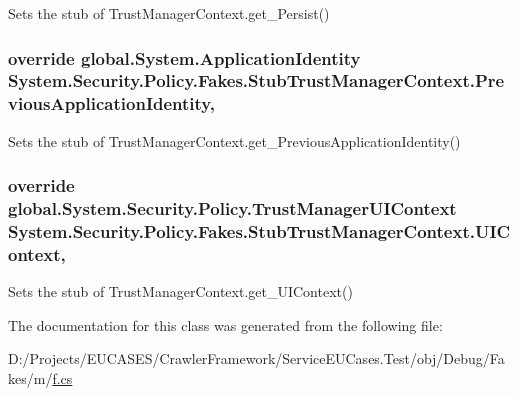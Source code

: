 Sets the stub of Trust\-Manager\-Context.\-get\-\_\-\-Persist()

\hypertarget{class_system_1_1_security_1_1_policy_1_1_fakes_1_1_stub_trust_manager_context_a607ca6c8527dcd2dd3aedb20d40cab5b}{
\subsubsection[{Previous\-Application\-Identity}]{\setlength{\rightskip}{0pt plus 5cm}override global.\-System.\-Application\-Identity System.\-Security.\-Policy.\-Fakes.\-Stub\-Trust\-Manager\-Context.\-Previous\-Application\-Identity\hspace{0.3cm}{\ttfamily [get]}, {\ttfamily [set]}}}\label{class_system_1_1_security_1_1_policy_1_1_fakes_1_1_stub_trust_manager_context_a607ca6c8527dcd2dd3aedb20d40cab5b}


Sets the stub of Trust\-Manager\-Context.\-get\-\_\-\-Previous\-Application\-Identity()

\hypertarget{class_system_1_1_security_1_1_policy_1_1_fakes_1_1_stub_trust_manager_context_a27fe169ba01ad0c4d2f5cb620e6fcdb6}{
\subsubsection[{U\-I\-Context}]{\setlength{\rightskip}{0pt plus 5cm}override global.\-System.\-Security.\-Policy.\-Trust\-Manager\-U\-I\-Context System.\-Security.\-Policy.\-Fakes.\-Stub\-Trust\-Manager\-Context.\-U\-I\-Context\hspace{0.3cm}{\ttfamily [get]}, {\ttfamily [set]}}}\label{class_system_1_1_security_1_1_policy_1_1_fakes_1_1_stub_trust_manager_context_a27fe169ba01ad0c4d2f5cb620e6fcdb6}


Sets the stub of Trust\-Manager\-Context.\-get\-\_\-\-U\-I\-Context()



The documentation for this class was generated from the following file\-:\begin{DoxyCompactItemize}
\item 
D\-:/\-Projects/\-E\-U\-C\-A\-S\-E\-S/\-Crawler\-Framework/\-Service\-E\-U\-Cases.\-Test/obj/\-Debug/\-Fakes/m/\hyperlink{m_2f_8cs}{f.\-cs}\end{DoxyCompactItemize}
